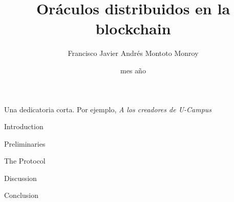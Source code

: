 \documentclass[upright, contnum]{umemoria}
\author{Francisco Javier Andr\'es Montoto Monroy}
\title{Or\'aculos distribuidos en la blockchain}
\date{mes {a\~no}}
\begin{document}
\frontmatter
\maketitle

\begin{abstract}
	
\end{abstract}

\begin{dedicatoria} %
	Una dedicatoria corta. Por ejemplo, \emph{A los creadores de U-Campus}
\end{dedicatoria}

\begin{thanks} %
	\lipsum[1-2]
\end{thanks}
\cleardoublepage
{}
\tableofcontents
\listoftables %
\listoffigures %

\mainmatter

\begin{my_section}{Introduction}
	
\end{my_section}

\begin{my_section}{Preliminaries}
	
	
	
	
	
\end{my_section}

\begin{my_section}{The Protocol}
    
	
	
	
	
	
\end{my_section}

\begin{my_section}{Discussion}
	
    
    
\end{my_section}

\begin{my_section}{Conclusion}
	
\end{my_section}

\printbibliography
\end{document}
